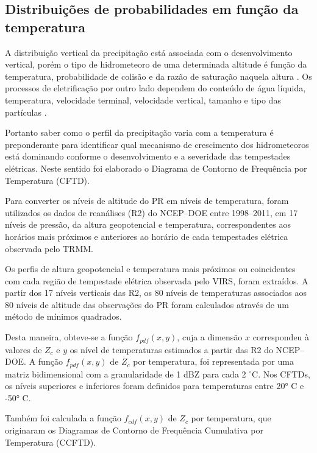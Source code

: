 \subsection{Distribuições de probabilidades em função da  temperatura}

A distribuição vertical da precipitação está associada com o desenvolvimento vertical, porém o tipo de hidrometeoro de uma  determinada altitude é função da temperatura, probabilidade de colisão e da razão de saturação naquela altura \cite[p.~263]{mason1971_2ed}. Os processos de eletrificação por outro lado dependem do conteúdo de água líquida, temperatura, velocidade terminal, velocidade vertical, tamanho e tipo das partículas \cite{Takahashi1978,Saunders1999,Takahashi2002,avila2009}.

Portanto saber como o perfil da precipitação varia com a temperatura é preponderante para identificar qual mecanismo de crescimento dos hidrometeoros está dominando conforme o desenvolvimento e a severidade das tempestades elétricas. Neste sentido foi elaborado o Diagrama de Contorno de Frequência por Temperatura (CFTD).  


Para converter os níveis de altitude do PR em níveis de temperatura, foram utilizados os dados de reanálises (R2) do NCEP--DOE entre 1998--2011, em 17 níveis de pressão, da altura geopotencial e temperatura, correspondentes aos horários mais próximos e anteriores ao horário de cada tempestades elétrica observada pelo TRMM.

Os perfis de altura geopotencial e temperatura mais próximos ou coincidentes com cada região de tempestade elétrica observada pelo VIRS, foram extraídos. A partir dos 17 níveis verticais das R2, os 80 níveis de temperaturas associados aos 80 níveis de altitude das observações do PR foram calculados através de um método de mínimos quadrados.

Desta maneira, obteve-se a função $f_{pdf}(x,y)$, cuja a dimensão $x$ correspondeu à valores de $Z_{c}$ e $y$ os nível de temperaturas estimados a partir das R2 do NCEP--DOE. A função $f_{pdf}(x,y)$ de $Z_c$ por temperatura, foi representada por uma matriz bidimensional com a granularidade de 1 dBZ para cada 2 $^{\circ}$C. Nos CFTDs, os níveis superiores e inferiores foram definidos para temperaturas entre 20° C e -50° C.

Também foi calculada a função $f_{cdf}(x,y)$ de $Z_c$ por temperatura, que originaram os Diagramas de Contorno de Frequência Cumulativa por Temperatura (CCFTD).     
